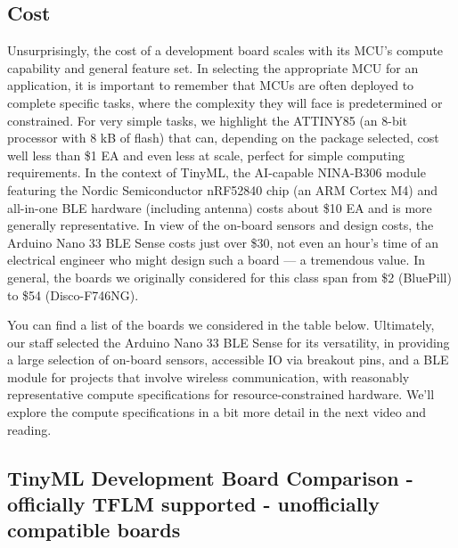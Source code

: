 \subsection{Cost}

    Unsurprisingly, the cost of a development board scales with its MCU’s compute capability and general feature set. In selecting the appropriate MCU for an application, it is important to remember that MCUs are often deployed to complete specific tasks, where the complexity they will face is predetermined or constrained. For very simple tasks, we highlight the ATTINY85 (an 8-bit processor with 8 kB of flash) that can, depending on the package selected, cost well less than \$1 EA and even less at scale, perfect for simple computing requirements. In the context of TinyML, the AI-capable NINA-B306 module featuring the Nordic Semiconductor nRF52840 chip (an ARM Cortex M4) and all-in-one BLE hardware (including antenna) costs about \$10 EA and is more generally representative. In view of the on-board sensors and design costs, the Arduino Nano 33 BLE Sense costs just over \$30, not even an hour's time of an electrical engineer who might design such a board — a tremendous value. In general, the boards we originally considered for this class span from \$2 (BluePill) to \$54 (Disco-F746NG).
    
    You can find a list of the boards we considered in the table below. Ultimately, our staff selected the Arduino Nano 33 BLE Sense for its versatility, in providing a large selection of on-board sensors, accessible IO via breakout pins, and a BLE module for projects that involve wireless communication, with reasonably representative compute specifications for resource-constrained hardware. We’ll explore the compute specifications in a bit more detail in the next video and reading.
    
\subsection{TinyML Development Board Comparison   - officially TFLM supported   - unofficially compatible boards}

